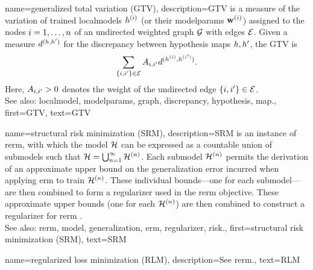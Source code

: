 	
{name={generalized total variation (GTV)}, 
	description={GTV is a 
		measure of the variation of trained \glspl{localmodel} $h^{(i)}$ 
		(or their \gls{modelparams} $\mathbf{w}^{(i)}$) assigned to the nodes $i=1, \ldots, n$ 
		of an undirected weighted \gls{graph} $\mathcal{G}$ with edges $\mathcal{E}$. Given a measure $d^{(h,h')}$ 
		for the \gls{discrepancy} between \gls{hypothesis} \glspl{map} $h,h'$, the GTV is 
		\begin{equation} 
			\nonumber
			\sum_{\{i,i'\}\in \mathcal{E}} A_{i,i'} 
			d^{(h^{(i)},h^{(i')})}.
		\end{equation}
		Here, $A_{i,i'}>0$ denotes the weight of the undirected edge $\{i,i'\}\in \mathcal{E}$.
				\\
		See also: \gls{localmodel}, \gls{modelparams}, \gls{graph}, \gls{discrepancy}, \gls{hypothesis}, \gls{map}.},
	first={GTV},
	text={GTV} 
}
	
{name={structural risk minimization (SRM)}, 
	description={SRM is an
		instance of \gls{rerm}, with which the \gls{model} $\mathcal{H}$ can be expressed 
		as a countable union of submodels such that $\mathcal{H} = \bigcup_{n=1}^{\infty} \mathcal{H}^{(n)}$. 
		Each submodel $\mathcal{H}^{(n)}$ permits the derivation of an approximate upper bound 
		on the \gls{generalization} error incurred when applying \gls{erm} to train $\mathcal{H}^{(n)}$. 
		These individual bounds—one for each submodel—are then combined to form a \gls{regularizer} 
		used in the \gls{rerm} objective. 
        		These approximate upper bounds (one for each $\mathcal{H}^{(n)}$) are then combined 
		to construct a \gls{regularizer} for \gls{rerm} \cite[Sec.\ 7.2]{ShalevMLBook}.
				\\
		See also: \gls{rerm}, \gls{model}, \gls{generalization}, \gls{erm}, \gls{regularizer}, \gls{risk}.},
	first={structural risk minimization (SRM)},
	text={SRM}
 }

 {name={regularized loss minimization (RLM)},
 	description={See \gls{rerm}.},
 	text={RLM}
 }
 

